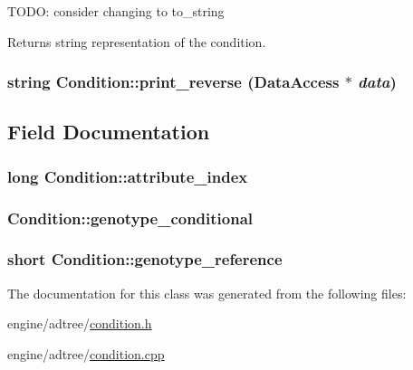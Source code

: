 TODO: consider changing to to\_\-string

\begin{DoxyReturn}{Returns}
string representation of the condition. 
\end{DoxyReturn}
\hypertarget{classCondition_a8307a156ebd3e09433f30bf9975f60d6}{
\subsubsection[{print\_\-reverse}]{\setlength{\rightskip}{0pt plus 5cm}string Condition::print\_\-reverse ({\bf DataAccess} $\ast$ {\em data})}}
\label{classCondition_a8307a156ebd3e09433f30bf9975f60d6}


\subsection{Field Documentation}
\hypertarget{classCondition_a081912e5b4f419de020299acbc8ee760}{
\subsubsection[{attribute\_\-index}]{\setlength{\rightskip}{0pt plus 5cm}long {\bf Condition::attribute\_\-index}}}
\label{classCondition_a081912e5b4f419de020299acbc8ee760}
\hypertarget{classCondition_afe18e96245b5ebaa6bf8318ec9184d82}{
\subsubsection[{genotype\_\-conditional}]{ {\bf Condition::genotype\_\-conditional}}}
\label{classCondition_afe18e96245b5ebaa6bf8318ec9184d82}
\hypertarget{classCondition_a11cbb60b2a8ee2446b10f0dc8858cfae}{
\subsubsection[{genotype\_\-reference}]{\setlength{\rightskip}{0pt plus 5cm}short {\bf Condition::genotype\_\-reference}}}
\label{classCondition_a11cbb60b2a8ee2446b10f0dc8858cfae}


The documentation for this class was generated from the following files:\begin{DoxyCompactItemize}
\item 
engine/adtree/\hyperlink{condition_8h}{condition.h}\item 
engine/adtree/\hyperlink{condition_8cpp}{condition.cpp}\end{DoxyCompactItemize}
